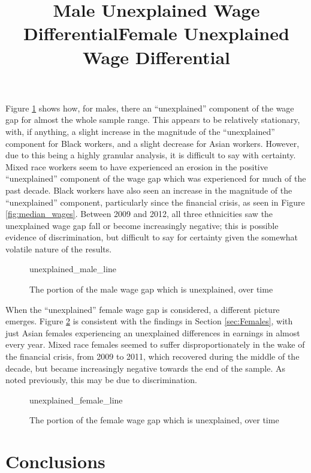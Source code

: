 \documentclass[class=article, crop=false]{standalone}
\begin{document}
Figure \ref{fig:unexplained_male_line} shows how, for males, there an \enquote{unexplained} component of the wage gap for almost the whole sample range. This appears to be relatively stationary, with, if anything, a slight increase in the magnitude of the \enquote{unexplained} component for Black workers, and a slight decrease for Asian workers. However, due to this being a highly granular analysis, it is difficult to say with certainty. Mixed race workers seem to have experienced an erosion in the positive \enquote{unexplained} component of the wage gap which was experienced for much of the past decade. Black workers have also seen an increase in the magnitude of the \enquote{unexplained} component, particularly since the financial crisis, as seen in Figure \ref{fig:median_wages}. Between 2009 and 2012, all three ethnicities saw the unexplained wage gap fall or become increasingly negative; this is possible evidence of discrimination, but difficult to say for certainty given the somewhat volatile nature of the results.

\begin{figure}[h]
\centering
    \title{Male Unexplained Wage Differential}
    {unexplained_male_line}
    \caption{The portion of the male wage gap which is unexplained, over time}
    \label{fig:unexplained_male_line}
\end{figure}

When the \enquote{unexplained} female wage gap is considered, a different picture emerges. Figure \ref{fig:unexplained_female_line} is consistent with the findings in Section \ref{sec:Females}, with just Asian females experiencing an unexplained differences in earnings in almost every year. Mixed race females seemed to suffer disproportionately in the wake of the financial crisis, from 2009 to 2011, which recovered during the middle of the decade, but became increasingly negative towards the end of the sample. As noted previously, this may be due to discrimination.
\begin{figure}[h]
\centering
    \title{Female Unexplained Wage Differential}
    {unexplained_female_line}
    \caption{The portion of the female wage gap which is unexplained, over time}
    \label{fig:unexplained_female_line}
\end{figure}

\section{Conclusions}
\label{sec:conclusions}
\end{document}

